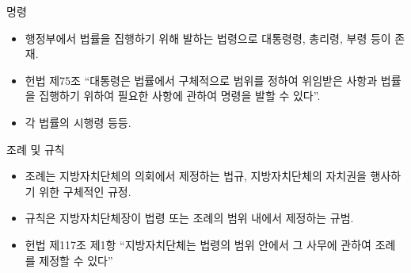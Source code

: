 \documentclass[aspectratio=169,xcolor=dvipsnames,handout]{beamer}
\begin{document}
\begin{frame}{명령}
    \begin{itemize}
        \item 행정부에서 법률을 집행하기 위해 발하는 법령으로 대통령령, 총리령, 부령 등이 존재.
        \item 헌법 제75조 ``대통령은 법률에서 구체적으로 범위를 정하여 위임받은 사항과 법률을 집행하기 위하여 필요한 사항에 관하여 명령을 발할 수 있다''.
        \item 각 법률의 시행령 등등.
    \end{itemize}
\end{frame}

\begin{frame}{조례 및 규칙}
    \begin{itemize}
        \item 조례는 지방자치단체의 의회에서 제정하는 법규, 지방자치단체의 자치권을 행사하기 위한 구체적인 규정. 
        \item 규칙은 지방자치단체장이 법령 또는 조례의 범위 내에서 제정하는 규범.
        \item 헌법 제117조 제1항 ``지방자치단체는 법령의 범위 안에서 그 사무에 관하여 조례를 제정할 수 있다''
    \end{itemize}
\end{frame}
\end{document}
